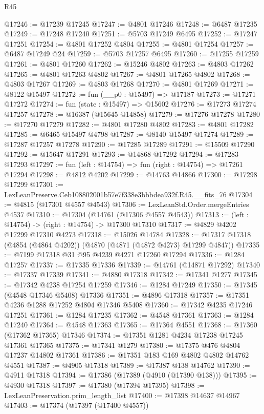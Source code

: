 \begin{lexlean}{R45}
\begin{coremodule}
@17246 := @17239 @17245
@17247 := @4801 @17246
@17248 := @6487 @17235
@17249 := @17248 @17240
@17251 := @5703 @17249 @6495
@17252 := @17247 @17251
@17254 := @4801 @17252 @4804
@17255 := @4801 @17254
@17257 := @6487 @17249 @24
@17259 := @5703 @17257 @6495
@17260 := @17255 @17259
@17261 := @4801 @17260
@17262 := @15246 @4802
@17263 := @4803 @17262
@17265 := @4801 @17263 @4802
@17267 := @4801 @17265 @4802
@17268 := @4803 @17267
@17269 := @4803 @17268
@17270 := @4801 @17269
@17271 := @8122 @15497
@17272 := fun (__p0 : @15497) => @17187
@17273 := @17271 @17272
@17274 := fun (state : @15497) => @15602
@17276 := @17273 @17274 @17257
@17278 := @16387 (@15645 @14858)
@17279 := @17276 @17278
@17280 := @17270 @17279
@17282 := @4801 @17280 @4802
@17283 := @4801 @17282
@17285 := @6465 @15497 @4798
@17287 := @8140 @15497 @17274
@17289 := @17287 @17257 @17278
@17290 := @17285 @17289
@17291 := @15509 @17290
@17292 := @15647 @17291
@17293 := @14868 @17292
@17294 := @17283 @17293
@17297 := fun (left : @14754) => fun (right : @14754) => @17261 @17294
@17298 := @4812 @4202
@17299 := @14763 @14866
@17300 := @17298 @17299
@17301 := LexLeanPreserve.Ceb108802001b57e7f338e3bbbdea932f.R45.__fits_76
@17304 := @4815 (@17301 @4557 @4543)
@17306 := LexLeanStd.Order.mergeEntries @4537
@17310 := @17304 (@14761 (@17306 @4557 @4543))
@17313 := (left : @14754) -> (right : @14754) -> @17300 @17310
@17317 := @4829 @4202 @17299 @17310 @4273
@17318 := @15026 @14784
@17328 := @17317 @17318 (@4854 (@4864 @4202)) (@4870 (@4871 (@4872 @4273) @17299 @4847))
@17335 := @7199 @17318 @31 @95 @4239 @4271 @17260 @17294
@17336 := @1284 @17257
@17337 := @17335 @17336
@17339 := @14761 (@14871 @17292)
@17340 := @17337 @17339
@17341 := @4880 @17318
@17342 := @17341 @1277
@17345 := @17342 @4238 @17254 @17259
@17346 := @1284 @17249
@17350 := @17345 (@4548 @17346 @5408) @17336
@17351 := @4896 @17318
@17357 := @17351 @4236 @1288 @17252 @4804 @17346 @5408
@17360 := @17342 @4235 @17246 @17251
@17361 := @1284 @17235
@17362 := @4548 @17361
@17363 := @1284 @17240
@17364 := @4548 @17363
@17365 := @17364 @4551
@17368 := @17360 (@17362 @17365) @17346
@17374 := @17351 @1281 @4234 @17238 @17245 @17361 @17365
@17375 := @17341 @1279
@17380 := @17375 @476 @4804 @17237 @14802 @17361
@17386 := @17351 @183 @169 @4802 @4802 @14762 @4551
@17387 := @4905 @17318
@17389 := @17387 @138 @14762
@17390 := @4911 @17318
@17394 := @17386 (@17389 (@4910 (@17390 @138)))
@17395 := @4930 @17318
@17397 := @17380 (@17394 @17395)
@17398 := LexLeanPreservation.prim_length_list
@17400 := @17398 @14637 @14967
@17403 := @17374 (@17397 (@17400 @4557))

\end{coremodule}
\end{lexlean}
